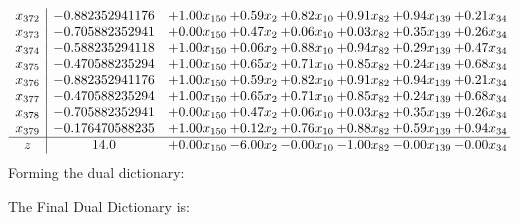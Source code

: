 \documentclass[8pt]{article}
\begin{document}
\[\begin{array}{c| c c@{\hskip 2pt} c@{\hskip 2pt} c@{\hskip 2pt} c@{\hskip 2pt} c@{\hskip 2pt} c@{\hskip 2pt} }
 x_{372}   &  -0.882352941176 & +  1.00 x_{150} & +  0.59 x_{2} & +  0.82 x_{10} & +  0.91 x_{82} & +  0.94 x_{139} & +  0.21 x_{34}\\
 x_{373}   &  -0.705882352941 & +  0.00 x_{150} & +  0.47 x_{2} & +  0.06 x_{10} & +  0.03 x_{82} & +  0.35 x_{139} & +  0.26 x_{34}\\
 x_{374}   &  -0.588235294118 & +  1.00 x_{150} & +  0.06 x_{2} & +  0.88 x_{10} & +  0.94 x_{82} & +  0.29 x_{139} & +  0.47 x_{34}\\
 x_{375}   &  -0.470588235294 & +  1.00 x_{150} & +  0.65 x_{2} & +  0.71 x_{10} & +  0.85 x_{82} & +  0.24 x_{139} & +  0.68 x_{34}\\
 x_{376}   &  -0.882352941176 & +  1.00 x_{150} & +  0.59 x_{2} & +  0.82 x_{10} & +  0.91 x_{82} & +  0.94 x_{139} & +  0.21 x_{34}\\
 x_{377}   &  -0.470588235294 & +  1.00 x_{150} & +  0.65 x_{2} & +  0.71 x_{10} & +  0.85 x_{82} & +  0.24 x_{139} & +  0.68 x_{34}\\
 x_{378}   &  -0.705882352941 & +  0.00 x_{150} & +  0.47 x_{2} & +  0.06 x_{10} & +  0.03 x_{82} & +  0.35 x_{139} & +  0.26 x_{34}\\
 x_{379}   &  -0.176470588235 & +  1.00 x_{150} & +  0.12 x_{2} & +  0.76 x_{10} & +  0.88 x_{82} & +  0.59 x_{139} & +  0.94 x_{34}\\
\hline
z    &  14.0 & +  0.00 x_{150} & -6.00 x_{2} & -0.00 x_{10} & -1.00 x_{82} & -0.00 x_{139} & -0.00 x_{34}\\
\end{array}\]
Forming the dual dictionary:

The Final Dual Dictionary is: 
\end{document}

